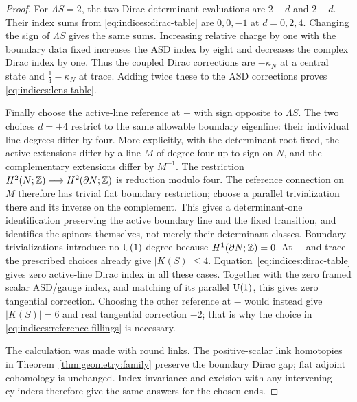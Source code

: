 \begin{proof}
For $\Lambda S=2$, the two Dirac determinant evaluations are $2+d$ and
$2-d$.  Their index sums from \eqref{eq:indices:dirac-table} are $0,0,-1$
at $d=0,2,4$.  Changing the sign of $\Lambda S$ gives the same sums.
Increasing relative charge by one with the boundary data fixed increases
the ASD index by eight and decreases the complex Dirac index by one.
Thus the coupled Dirac corrections are $-\kappa_N$ at a central state and
$\frac14-\kappa_N$ at trace.  Adding twice these to the ASD corrections
proves \eqref{eq:indices:lens-table}.

Finally choose the active-line reference at $-$ with sign opposite to
$\Lambda S$.  The two choices $d=\pm4$ restrict to the same allowable
boundary eigenline: their individual line degrees differ by four.
More explicitly, with the determinant root fixed, the active extensions
differ by a line $M$ of degree four up to sign on $N$, and the complementary
extensions differ by $M^{-1}$.  The restriction
$H^2(N;\mathbb Z)\longrightarrow H^2(\partial N;\mathbb Z)$ is reduction modulo four.
The reference connection on $M$ therefore has trivial flat boundary
restriction; choose a parallel trivialization there and its inverse on
the complement.  This gives a determinant-one identification preserving
the active boundary line and the fixed transition, and identifies the
spinors themselves, not merely their determinant classes.
Boundary trivializations introduce no $\operatorname{U}(1)$ degree because
$H^1(\partial N;\mathbb Z)=0$.
At $+$ and trace the prescribed choices
already give $|K(S)|\le4$.  Equation~\eqref{eq:indices:dirac-table} gives
zero active-line Dirac index in all these cases.  Together with the zero
framed scalar ASD/gauge index, and matching of its parallel $\operatorname{U}(1)$, this
gives zero tangential correction.  Choosing the other reference at $-$
would instead give $|K(S)|=6$ and real tangential correction $-2$; that is
why the choice in \eqref{eq:indices:reference-fillings} is necessary.

The calculation was made with round links.  The positive-scalar link
homotopies in Theorem~\ref{thm:geometry:family} preserve the boundary Dirac
gap; flat adjoint cohomology is unchanged.  Index invariance and excision
with any intervening cylinders therefore give the same answers for the
chosen ends.
\end{proof}

